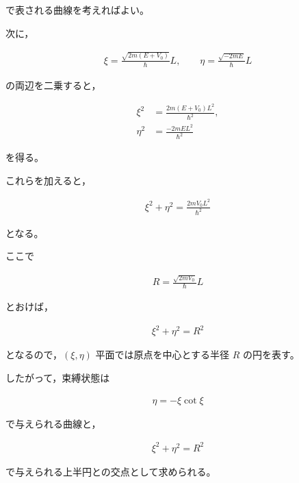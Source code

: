 \documentclass[platex,dvipdfmx,a4paper]{jsarticle}
\begin{document}
で表される曲線を考えればよい。

次に，

\begin{align*}
\xi
=
\frac{\sqrt{2m(E+V_0)}}{\hbar}L,
\qquad
\eta
=
\frac{\sqrt{-2mE}}{\hbar}L
\end{align*}

の両辺を二乗すると，

\begin{align*}
\xi^2
&=
\frac{2m(E+V_0)L^2}{\hbar^2},\\
\eta^2
&=
\frac{-2mEL^2}{\hbar^2}
\end{align*}

を得る。

これらを加えると，

\begin{align*}
\xi^2+\eta^2
=
\frac{2mV_0L^2}{\hbar^2}
\end{align*}

となる。

ここで

\begin{align*}
R
=
\frac{\sqrt{2mV_0}}{\hbar}L
\end{align*}

とおけば，

\begin{align*}
\xi^2+\eta^2
=
R^2
\end{align*}

となるので，$(\xi,\eta)$ 平面では原点を中心とする半径 $R$ の円を表す。

したがって，束縛状態は

\begin{align*}
\eta=-\xi\cot\xi
\end{align*}

で与えられる曲線と，

\begin{align*}
\xi^2+\eta^2=R^2
\end{align*}

で与えられる上半円との交点として求められる。
\end{document}
